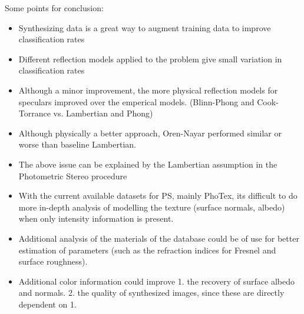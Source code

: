 \hypertarget{conclusion}{
}

Some points for conclusion:
\begin{itemize}
	\item Synthesizing data is a great way to augment training data to improve classification rates
	\item Different reflection models applied to the problem give small variation in classification rates
	\item Although a minor improvement, the more physical reflection models for speculars improved over the emperical models. (Blinn-Phong and Cook-Torrance vs. Lambertian and Phong)
	\item Although physically a better approach, Oren-Nayar performed similar or worse than baseline Lambertian. 
	\item The above issue can be explained by the Lambertian assumption in the Photometric Stereo procedure
	\item With the current available datasets for PS, mainly PhoTex, its difficult to do more in-depth analysis of modelling the texture (surface normals, albedo) when only intensity information is present. 
	\item Additional analysis of the materials of the database could be of use for better estimation of parameters (such as the refraction indices for Fresnel and surface roughness).
	\item Additional color information could improve 1. the recovery of surface albedo and normals. 2. the quality of synthesized images, since these are directly dependent on 1.
\end{itemize}
